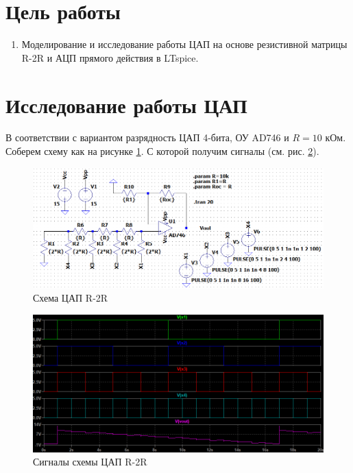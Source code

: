 \section*{Цель работы}

\begin{enumerate}
    \item Моделирование и исследование работы ЦАП на основе резистивной
    матрицы R-2R и АЦП прямого действия в LTspice.
\end{enumerate}

\section*{Исследование работы ЦАП}

В соответствии с вариантом разрядность ЦАП 4-бита, ОУ AD746 и $R=10$ кОм.
Соберем схему как на рисунке \ref{fig:r2r_scheme}. С которой получим сигналы
(см. рис. \ref{fig:r2r_signals}). 

\begin{figure}[H]
    \centering
    \includegraphics[width=\linewidth]{figs/R-2R_scheme.png}
    \caption{Схема ЦАП R-2R}
    \label{fig:r2r_scheme}
\end{figure}

\begin{figure}[H]
    \centering
    \includegraphics[width=\linewidth]{figs/R-2R_signals.png}
    \caption{Сигналы схемы ЦАП R-2R}
    \label{fig:r2r_signals}
\end{figure}

